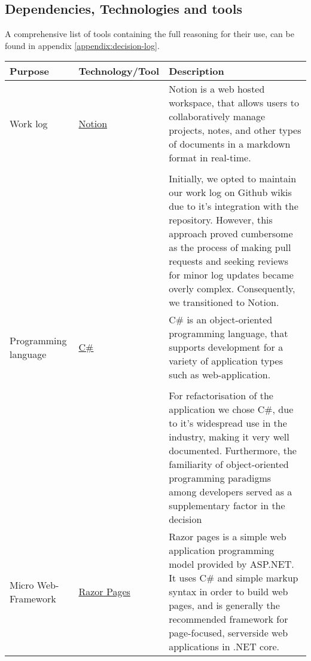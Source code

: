 
\subsection{Dependencies, Technologies and tools}


A comprehensive list of tools containing the full reasoning for their use, can be found in appendix \ref{appendix:decision-log}.

\begin{longtable}{|p{}|p{} | p{}|}
    \hline
    \textbf{Purpose} & \textbf{Technology/Tool} & \textbf{Description}\\
    \hline
    Work log & \href{https://www.notion.so/help/guides/category/documentation}{Notion} & Notion is a web hosted workspace, that allows users to collaboratively manage projects, notes, and other types of documents in a markdown format in real-time.\\
    &&\\
    && Initially, we opted to maintain our work log on Github wikis due to it's integration with the repository. However, this approach proved cumbersome as the process of making pull requests and seeking reviews for minor log updates became overly complex. Consequently, we transitioned to Notion.\\
    \hline
    Programming language & \href{https://learn.microsoft.com/en-us/dotnet/csharp/}{C\#} &
    C\#  is an object-oriented programming language, that supports development for a variety of application types such as web-application.\\
    && \\
    && For refactorisation of the application we chose C\#, due to it's widespread use in the industry, making it very well documented. Furthermore, the familiarity of object-oriented programming paradigms among developers served as a supplementary factor in the decision\\
    \hline
    Micro Web-Framework & \href{https://learn.microsoft.com/en-us/aspnet/core/razor-pages/?view=aspnetcore-8.0&tabs=visual-studio}{Razor Pages} & Razor pages is a simple web application programming model provided by ASP.NET. It uses C\# and simple markup syntax in order to build web pages, and is generally the recommended framework for page-focused, serverside web applications in .NET core.\\

\end{longtable}
